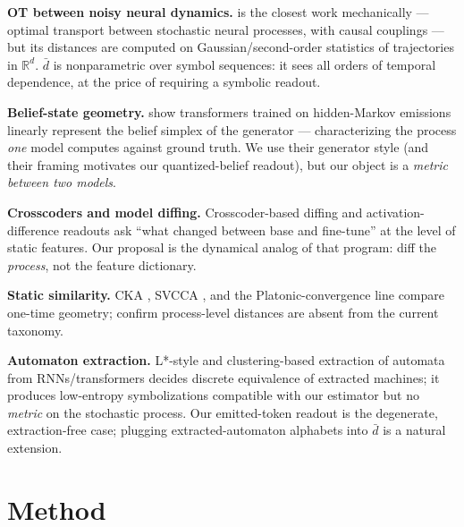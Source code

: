 \documentclass[11pt]{article}
\newcommand{\dbar}{\bar d}
\newcommand{\R}{\mathbb R}
\begin{document}
\textbf{OT between noisy neural dynamics.} \citet{nejatbakhsh2024comparing} is the
closest work mechanically --- optimal transport between stochastic neural processes,
with causal couplings --- but its distances are computed on Gaussian/second-order
statistics of trajectories in $\R^d$. $\dbar$ is nonparametric over symbol sequences:
it sees all orders of temporal dependence, at the price of requiring a symbolic
readout.

\textbf{Belief-state geometry.} \citet{shai2024transformers} show transformers
trained on hidden-Markov emissions linearly represent the belief simplex of the
generator --- characterizing the process \emph{one} model computes against ground
truth. We use their generator style (and their framing motivates our quantized-belief
readout), but our object is a \emph{metric between two models}.

\textbf{Crosscoders and model diffing.} Crosscoder-based diffing
\citep{jiralerspong2026crossarch, deltacrosscoder2026} and activation-difference
readouts \citep{minder2025narrow} ask ``what changed between base and fine-tune'' at
the level of static features. Our proposal is the dynamical analog of that program:
diff the \emph{process}, not the feature dictionary.

\textbf{Static similarity.} CKA \citep{kornblith2019similarity}, SVCCA
\citep{raghu2017svcca}, and the Platonic-convergence line \citep{huh2024platonic}
compare one-time geometry; \citet{klabunde2023similarity} confirm process-level
distances are absent from the current taxonomy.

\textbf{Automaton extraction.} L*-style and clustering-based extraction of automata
from RNNs/transformers \citep{weiss2018extracting, adriaensen2024extracting,
oliva2020fsm} decides discrete equivalence of extracted machines; it produces
low-entropy symbolizations compatible with our estimator but no \emph{metric} on the
stochastic process. Our emitted-token readout is the degenerate, extraction-free case;
plugging extracted-automaton alphabets into $\dbar$ is a natural extension.

\section{Method}\label{sec:method}
\end{document}

